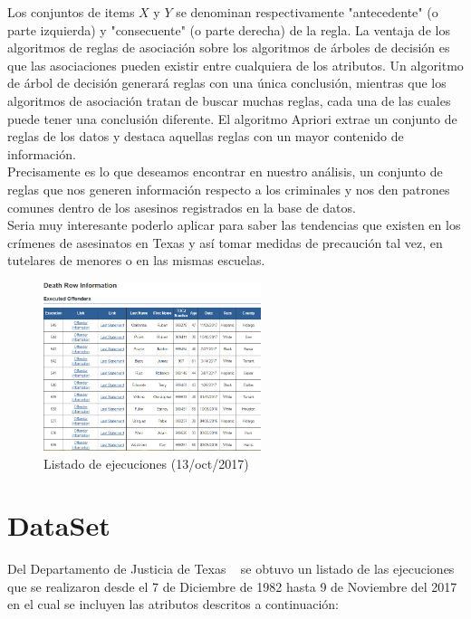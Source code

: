 \documentclass[sigconf]{acmart}
\begin{document}
Los conjuntos de items $X$ y $Y$ se denominan respectivamente "antecedente" (o parte izquierda) y "consecuente" (o parte derecha) de la regla.
La ventaja de los algoritmos de reglas de asociación sobre los algoritmos de árboles de decisión es que las asociaciones pueden existir entre cualquiera de los atributos. Un algoritmo de árbol de decisión generará reglas con una única conclusión, mientras que los algoritmos de asociación tratan de buscar muchas reglas, cada una de las cuales puede tener una conclusión diferente.
El algoritmo Apriori extrae un conjunto de reglas de los datos y destaca aquellas reglas con un mayor contenido de información.\\ Precisamente es lo que deseamos encontrar en nuestro análisis, un conjunto de reglas que nos generen información respecto a los criminales y nos den patrones comunes dentro de los asesinos registrados en la base de datos.\\Seria muy interesante poderlo aplicar para saber las tendencias que existen en los crímenes de asesinatos en Texas y así tomar medidas de precaución tal vez, en tutelares de menores o en las mismas escuelas.
\begin{figure}[ht]
  \centering
  \includegraphics[width=2.5in]{d.PNG}
  \caption{Listado de ejecuciones (13/oct/2017)}
  \label{fig:deathRow}
\end{figure}

\section{DataSet}
Del Departamento de Justicia de Texas ~\cite{DeathRow} se obtuvo un listado de las ejecuciones que se realizaron desde el 7 de Diciembre de 1982 hasta 9 de Noviembre del 2017 en el cual se incluyen las atributos descritos a continuación:
\end{document}

